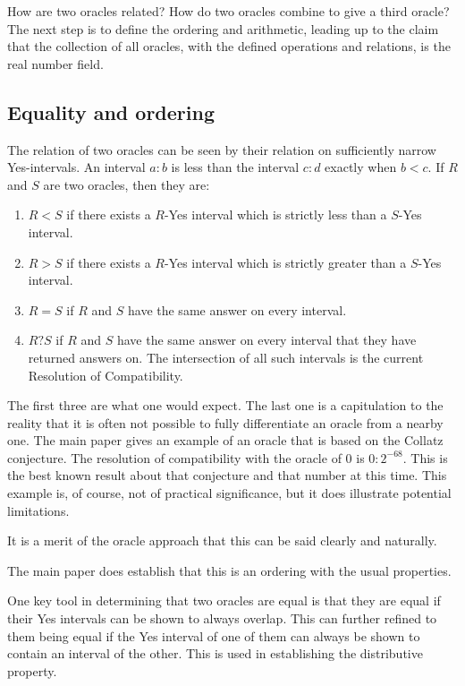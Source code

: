 \documentclass[12pt]{article}
\theoremstyle{remark}
\begin{document}
How are two oracles related? How do two oracles combine to give a third oracle?  The next step is to define the ordering and arithmetic, leading up to the claim that the collection of all oracles, with the defined operations and relations, is the real number field. 

\subsection{Equality and ordering}

The relation of two oracles can be seen by their relation on sufficiently narrow Yes-intervals. An interval $a:b$ is less than the interval $c:d$ exactly when $b < c$. If $R$ and $S$ are two oracles, then they are:
\begin{enumerate}
\item $R<S$ if there exists a $R$-Yes interval which is strictly less than a $S$-Yes interval.
\item $R>S$ if there exists a $R$-Yes interval which is strictly greater than a $S$-Yes interval.
\item $R=S$ if $R$ and $S$ have the same answer on every interval.
\item $R?S$ if $R$ and $S$ have the same answer on every interval that they have returned answers on. The intersection of all such intervals is the current Resolution of Compatibility. 
\end{enumerate}

The first three are what one would expect. The last one is a capitulation to the reality that it is often not possible to fully differentiate an oracle from a nearby one. The main paper gives an example of an oracle that is based on the Collatz conjecture. The resolution of compatibility with the oracle of 0 
 is $0:2^{-68}$. This is the best known result about that conjecture and that number at this time. This example is, of course, not of practical significance, but it does illustrate potential limitations. 

 It is a merit of the oracle approach that this can be said clearly and naturally. 

The main paper does establish that this is an ordering with the usual properties. 

One key tool in determining that two oracles are equal is that they are equal if their Yes intervals can be shown to always overlap. This can further refined to them being equal if the Yes interval of one of them can always be shown to contain an interval of the other. This is used in establishing the distributive property. 
\end{document}
